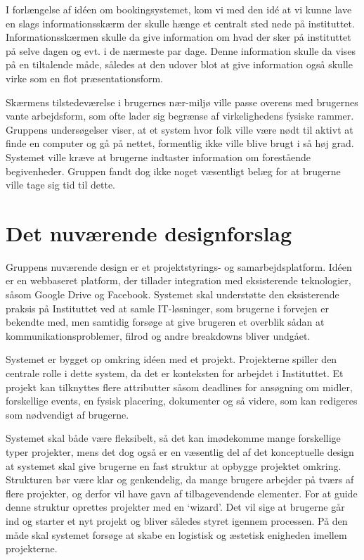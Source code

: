 I forlængelse af idéen om bookingsystemet, kom vi med den idé at vi kunne lave en slags informationsskærm der skulle hænge et centralt sted nede på instituttet. Informationsskærmen skulle da give information om hvad der sker på instituttet på selve dagen og evt. i de nærmeste par dage. Denne information skulle da vises på en tiltalende måde, således at den udover blot at give information også skulle virke som en flot præsentationsform. 

Skærmens tilstedeværelse i brugernes nær-miljø ville passe overens med brugernes vante arbejdsform, som ofte lader sig begrænse af virkelighedens fysiske rammer. Gruppens undersøgelser viser, at et system hvor folk ville være nødt til aktivt at finde en computer og gå på nettet, formentlig ikke ville blive brugt i så høj grad. Systemet ville kræve at brugerne indtaster information om forestående begivenheder. Gruppen fandt dog ikke noget væsentligt belæg for at brugerne ville tage sig tid til dette.

\section{Det nuværende designforslag}
Gruppens nuværende design er et projektstyrings- og samarbejdsplatform.
Idéen er en webbaseret platform, der tillader integration med eksisterende teknologier, såsom Google Drive og Facebook. Systemet skal understøtte den eksisterende praksis på Instituttet ved at samle IT-løsninger, som brugerne i forvejen er bekendte med, men samtidig forsøge at give brugeren et overblik sådan at kommunikationsproblemer, filrod og andre breakdowns bliver undgået. 

Systemet er bygget op omkring idéen med et projekt. Projekterne spiller den centrale rolle i dette system, da det er konteksten for arbejdet i Instituttet. Et projekt kan tilknyttes flere attributter såsom deadlines for ansøgning om midler, forskellige events, en fysisk placering, dokumenter og så videre, som kan redigeres som nødvendigt af brugerne. 

Systemet skal både være fleksibelt, så det kan imødekomme mange forskellige typer projekter, mens det dog også er en væsentlig del af det konceptuelle design at systemet skal give brugerne en fast struktur at opbygge projektet omkring. Strukturen bør være klar og genkendelig, da mange brugere arbejder på tværs af flere projekter, og derfor vil have gavn af tilbagevendende elementer.
For at guide denne struktur oprettes projekter med en ‘wizard’. Det vil sige at brugerne går ind og starter et nyt projekt og bliver således styret igennem processen. På den måde skal systemet forsøge at skabe en logistisk og æstetisk enigheden imellem projekterne. 

